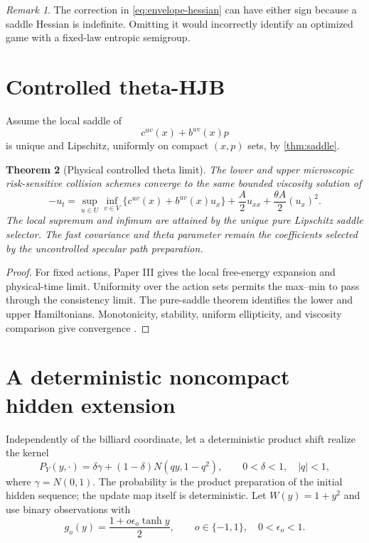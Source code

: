 \documentclass[11pt,reqno]{amsart}
\newtheorem{theorem}{Theorem}[section]
\theoremstyle{definition}
\theoremstyle{remark}
\newtheorem{remark}[theorem]{Remark}
\newcommand{\abs}[1]{\left\lvert #1\right\rvert}
\begin{document}
\begin{remark}
The correction in \eqref{eq:envelope-hessian} can have either sign because a
saddle Hessian is indefinite.  Omitting it would incorrectly identify an
optimized game with a fixed-law entropic semigroup.
\end{remark}

\section{Controlled theta-HJB}\label{sec:controlled-hjb}
Assume the local saddle of
\[
 c^{uv}(x)+b^{uv}(x)p
\]
is unique and Lipschitz, uniformly on compact $(x,p)$ sets, by
\cref{thm:saddle}.

\begin{theorem}[Physical controlled theta limit]\label{thm:controlled}
The lower and upper microscopic risk-sensitive collision schemes converge to
the same bounded viscosity solution of
\[
 -u_t
 =\sup_{u\in U}\inf_{v\in V}
 \{c^{uv}(x)+b^{uv}(x)u_x\}
 +\frac A2u_{xx}+\frac{\theta A}2(u_x)^2.
\]
The local supremum and infimum are attained by the unique pure Lipschitz saddle
selector.  The fast covariance and theta parameter remain the coefficients
selected by the uncontrolled specular path preparation.
\end{theorem}
\begin{proof}
For fixed actions, Paper III gives the local free-energy expansion and
physical-time limit.  Uniformity over the action sets permits the max--min to
pass through the consistency limit.  The pure-saddle theorem identifies the
lower and upper Hamiltonians.  Monotonicity, stability, uniform ellipticity,
and viscosity comparison give convergence
\cite{BarlesSouganidis1991,FlemingSoner2006}.
\end{proof}

\section{A deterministic noncompact hidden extension}\label{sec:hidden}
Independently of the billiard coordinate, let a deterministic product shift
realize the kernel
\[
 P_Y(y,\cdot)=\delta\gamma+(1-\delta)N(qy,1-q^2),
 \qquad 0<\delta<1,\quad\abs q<1,
\]
where $\gamma=N(0,1)$.  The probability is the product preparation of the
initial hidden sequence; the update map itself is deterministic.  Let
$W(y)=1+y^2$ and use binary observations with
\[
 g_o(y)=\frac{1+o\epsilon_o\tanh y}{2},
 \qquad o\in\{-1,1\},\quad0<\epsilon_o<1.
\]
\end{document}
